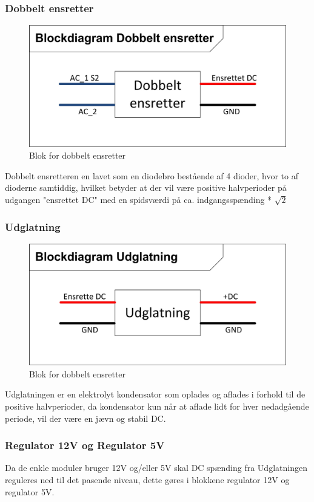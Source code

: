\subsubsection{Dobbelt ensretter}
\begin{figure}[H]
\centering
\includegraphics[scale=1]{billeder/DobbeltensretterBlok}
\caption{Blok for dobbelt ensretter}
\label{fig:DobbeltensretterBlok}
\end{figure}
Dobbelt ensretteren en lavet som en diodebro bestående af 4 dioder, hvor to af dioderne samtiddig, hvilket betyder at der vil være positive halvperioder på udgangen "ensrettet DC" med en spidsværdi på ca. indgangsspænding * $\sqrt{2}$
\subsubsection{Udglatning}
\begin{figure}[H]
\centering
\includegraphics[scale=1]{billeder/UdglatningsBlok}
\caption{Blok for dobbelt ensretter}
\label{fig:DobbeltensretterBlok}
\end{figure}
Udglatningen er en elektrolyt kondensator som oplades og aflades i forhold til de positive halvperioder, da kondensator kun når at aflade lidt for hver nedadgående periode, vil der være en jævn og stabil DC.  
\subsubsection{Regulator 12V og Regulator 5V}
Da de enkle moduler bruger 12V og/eller 5V skal DC spænding fra Udglatningen reguleres ned til det pasende niveau, dette gøres i blokkene regulator 12V og regulator 5V.

